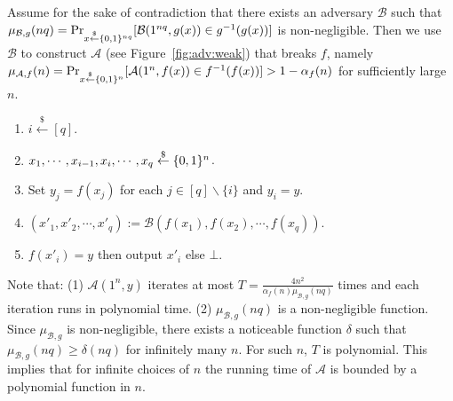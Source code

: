 Assume for the sake of contradiction that there exists an adversary $\mathcal{B}$ such that $\mu_{\mathcal{B},g}(nq) = \Pr_{x \stackrel{\$}{\leftarrow} \{0,1\}^{nq}}[ \mathcal{B}(1^{nq}, g(x)) \in g^{-1}(g(x))]$ is non-negligible.
Then we use $\mathcal{B}$ to construct $\mathcal{A}$ (see Figure~\ref{fig:adv:weak}) that breaks $f$, namely $\mu_{\mathcal{A},f}(n) = \Pr_{x \stackrel{\$}{\leftarrow} \{0,1\}^{n}}[ \mathcal{A}(1^n, f(x)) \in f^{-1}(f(x))] > 1 - \alpha_f(n)$ for sufficiently large $n$.
\begin{marginfigure}[0cm]
\begin{enumerate}
    \item $i \stackrel{\$}{\leftarrow} [q]$.
    \item $x_1, \cdots, x_{i-1}, x_i, \cdots, x_q \stackrel{\$}{\leftarrow} \{0,1\}^{n}$.
    \item Set $y_j = f(x_j)$ for each $j \in [q]\backslash \{i\}$ and $y_i = y$.
    \item $(x'_1, x'_2, \cdots, x'_q) := \mathcal{B} (f(x_1), f(x_2), \cdots, f(x_q))$.
    \item {$f(x'_i) = y$} then output $x'_i$ else $\bot$.
\end{enumerate}
\caption{Construction of $\mathcal{A}(1^n, y)$}
\label{fig:adv:weak}
\end{marginfigure}

Note that: (1) $\mathcal{A}(1^n, y)$ iterates at most $T = \frac{4n^2}{\alpha_f(n)\mu_{\mathcal{B},g}(nq)}$ times and each iteration runs in polynomial time. (2) $\mu_{\mathcal{B},g}(nq)$ is a non-negligible function. Since $\mu_{\mathcal{B},g}$ is non-negligible, there exists a noticeable function $\delta$ such that $\mu_{\mathcal{B},g}(nq) \geq \delta(nq)$ for infinitely many $n$. For such $n$, $T$ is polynomial. This implies that for infinite choices of $n$ the running time of $\mathcal{A}$ is bounded by a polynomial function in $n$.

